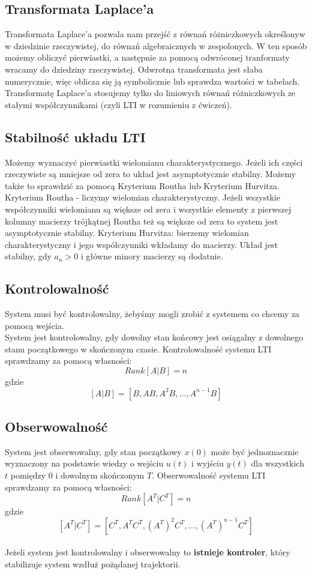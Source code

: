 \documentclass[12pt]{article}
\begin{document}
\subsection{Transformata Laplace'a}
Transformata Laplace'a pozwala nam przejść z równań różniczkowych określonyw w dziedzinie rzeczywistej, do równań algebraicznych w zespolonych. W ten sposób możemy obliczyć pierwiastki, a następnie za pomocą odwróconej tranformaty wracamy do dziedziny rzeczywistej. Odwrotna transformata jest słaba numerycznie, więc oblicza się ją symbolicznie lub sprawdza wartości w tabelach. Transformatę Laplace'a stosujemy tylko do liniowych równań różniczkowych ze stałymi współczynnikami (czyli LTI w rozumieniu z ćwiczeń). 

\subsection{Stabilność układu LTI}
Możemy wyznaczyć pierwiastki wielomianu charakterystycznego. Jeżeli ich części rzeczywiste są mniejsze od zera to układ jest asymptotycznie stabilny. Możemy także to sprawdzić za pomocą Kryterium Routha lub Kryterium Hurvitza. Kryterium Routha - liczymy wielomian charakterystyczny. Jeżeli wszystkie współczynniki wielomianu są większe od zera i wszystkie elementy z pierwszej kolumny macierzy trójkątnej Routha też są większe od zera to system jest asymptotycznie stabilny. Kryterium Hurvitza: bierzemy wielomian charakterystyczny i jego współczynniki wkładamy do macierzy. Układ jest stabilny, gdy $a_{n} > 0$ i główne minory macierzy są dodatnie.

\subsection{Kontrolowalność}
System musi być kontrolowalny, żebyśmy mogli zrobić z systemem co chcemy za pomocą wejścia.\\
System jest kontrolowalny, gdy dowolny stan końcowy jest osiągalny z dowolnego stanu początkowego w skończonym czasie. Kontrolowalność systemu LTI sprawdzamy za pomocą własności: $$Rank[A|B] = n$$ gdzie $$[A|B] = [B, AB, A^{2}B,...,A^{n-1}B]$$

\subsection{Obserwowalność}
System jest obserwowalny, gdy stan początkowy $x(0)$ może być jednoznacznie wyznaczony na podstawie wiedzy o wejściu $u(t)$ i wyjściu $y(t)$ dla wszystkich $t$ pomiędzy 0 i dowolnym skończonym $T$. Obserwowalność systemu LTI sprawdzamy za pomocą własności: $$Rank[A^{T} | C^{T}] = n$$ gdzie $$[A^{T} | C^{T}] = [C^{T}, A^{T}C^{T},(A^{T})^{2}C^{T},...,(A^{T})^{n-1}C^{T}]$$
~\\
Jeżeli system jest kontrolowalny i obserwowalny to \textbf{istnieje kontroler}, który stabilizuje system wzdłuż pożądanej trajektorii.
\end{document}
